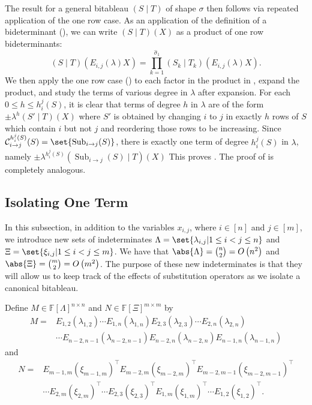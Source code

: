 \documentclass[10pt,a4paper]{amsart}
\DeclareMathOperator{\Sub}{Sub}
\newcommand*\F{\mathbb{F}}
\newcommand*\bigO[1]{%
    O\kern-0.0pt\left(#1\right)
}
\begin{document}
\begin{pf}
    The result for a general bitableau $(S \mid T)$ of shape $\sigma$ then follows via repeated application of the one row case.
    As an application of the definition of a bideterminant (), we can write $(S \mid T)(X)$ as a product of one row bideterminants:
    \begin{equation}\label{eq:Eij_left_each_row}
        (S \mid T)(E_{i, j}(\lambda)X) = \prod_{k = 1}^{\widehat{\sigma}_1} (S_k \mid T_k)(E_{i, j}(\lambda)X).
    \end{equation}
    We then apply the one row case () to each factor in the product in , expand the product, and study the terms of various degree in $\lambda$ after expansion.
    For each $0 \leq h \leq h_{i}^{j}(S)$, it is clear that terms of degree $h$ in $\lambda$ are of the form $\pm\lambda^{h}(S' \mid T)(X)$ where $S'$ is obtained by changing $i$ to $j$ in exactly $h$ rows of $S$ which contain $i$ but not $j$ and reordering those rows to be increasing.
    Since $\mathcal{C}^{h_{i}^{j}(S)}_{i \to j}(S) = \set{\Sub_{i \to j}(S)}$, there is exactly one term of degree $h_{i}^{j}(S)$ in $\lambda$, namely $\pm \lambda^{h_{i}^{j}(S)} (\Sub_{i \to j}(S) \mid T)(X)$
    This proves .
    The proof of  is completely analogous.
\end{pf}

\subsection{Isolating One Term}\label{sec:extract_det}  

In this subsection, in addition to the variables $x_{i,j}$, where $i\in [n]$ and $j\in [m]$, we introduce new sets of indeterminates $\Lambda = \set{\lambda_{i, j} | 1 \leq i < j \leq n}$ and $\Xi = \set{\xi_{i, j} | 1 \leq i < j \leq m}$.
We have that $\abs{\Lambda} = \binom{n}{2} = \bigO{n^2}$ and $\abs{\Xi} = \binom{m}{2} = \bigO{m^2}$.
The purpose of these new indeterminates is that they will allow us to keep track of the effects of substitution operators as we isolate a canonical bitableau.

Define $M \in \F[\Lambda]^{n\times n}$ and $N \in \F[\Xi]^{m\times m}$ by
\begin{align*}
M ={}& E_{1, 2}(\lambda_{1, 2}) \cdots E_{1, n}(\lambda_{1, n}) E_{2, 3}(\lambda_{2, 3}) \cdots E_{2, n}(\lambda_{2, n}) \\ 
&\cdots E_{n - 2, n - 1}(\lambda_{n - 2, n - 1}) E_{n - 2, n}(\lambda_{n - 2, n}) E_{n - 1, n}(\lambda_{n - 1, n})
\end{align*}
and
\begin{align*}
N ={}& E_{m - 1, m}(\xi_{m - 1, m})^{\top} E_{m - 2, m}(\xi_{m - 2, m})^\top E_{m - 2, m - 1}(\xi_{m - 2, m - 1})^\top \\ &
\cdots E_{2, m}(\xi_{2, m})^{\top} \cdots E_{2, 3}(\xi_{2, 3})^\top E_{1, m}(\xi_{1, m})^\top \cdots E_{1, 2}(\xi_{1, 2})^\top.
\end{align*}
\end{document}
